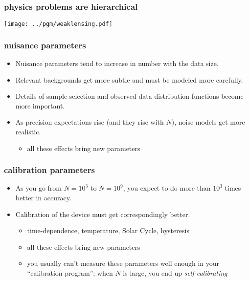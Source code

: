 \documentclass[pdftex]{beamer}
\begin{document}
\begin{frame}
  \frametitle{physics problems are hierarchical}
  \texttt{[image: ../pgm/weaklensing.pdf]}
\end{frame}

\begin{frame}
  \frametitle{nuisance parameters}
  \begin{itemize}
  \item Nuisance parameters tend to increase in number with the data size.
  \item Relevant backgrounds get more subtle and must be modeled more carefully.
  \item Details of sample selection and observed data distribution functions become more important.
  \item As precision expectations rise (and they rise with $N$), noise models get more realistic.
    \begin{itemize}
    \item all these effects bring new parameters
    \end{itemize}
  \end{itemize}
\end{frame}

\begin{frame}
  \frametitle{calibration parameters}
  \begin{itemize}
  \item As you go from $N=10^3$ to $N=10^9$, you expect to do more than $10^3$ times better in accuracy.
  \item Calibration of the device must get correspondingly better.
    \begin{itemize}
    \item time-dependence, temperature, Solar Cycle, hysteresis
    \item all these effects bring new parameters
    \item you usually can't measure these parameters well enough in your ``calibration program''; when $N$ is large, you end up \emph{self-calibrating}
    \end{itemize}
  \end{itemize}
\end{frame}
\end{document}
